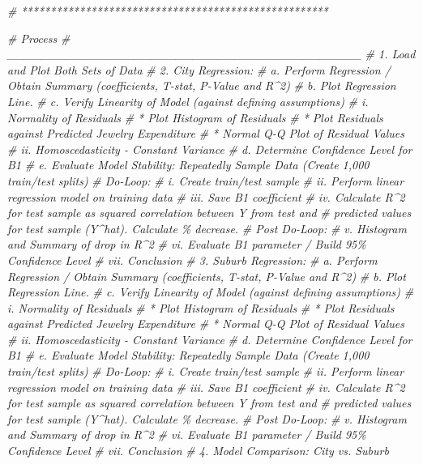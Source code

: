 \documentclass[
]{article}
\newenvironment{Shaded}{\begin{snugshade}}{\end{snugshade}}
\newcommand{\CommentTok}[1]{\textcolor[rgb]{0.56,0.35,0.01}{\textit{#1}}}
\begin{document}
\begin{Shaded}
\begin{Highlighting}[]
\CommentTok{\# *****************************************************}

\CommentTok{\# Process}
\CommentTok{\# \_\_\_\_\_\_\_\_\_\_\_\_\_\_\_\_\_\_\_\_\_\_\_\_\_\_\_\_\_\_\_\_\_\_\_\_\_\_\_\_\_\_}
\CommentTok{\# 1. Load and Plot Both Sets of Data}
\CommentTok{\# 2. City Regression:}
\CommentTok{\#    a. Perform Regression / Obtain Summary (coefficients, T{-}stat, P{-}Value and R\^{}2)}
\CommentTok{\#    b. Plot Regression Line.}
\CommentTok{\#    c. Verify Linearity of Model (against defining assumptions)}
\CommentTok{\#       i. Normality of Residuals}
\CommentTok{\#           * Plot Histogram of Residuals}
\CommentTok{\#           * Plot Residuals against Predicted Jewelry Expenditure}
\CommentTok{\#           * Normal Q{-}Q Plot of Residual Values}
\CommentTok{\#       ii. Homoscedasticity {-} Constant Variance}
\CommentTok{\#    d. Determine Confidence Level for B1}
\CommentTok{\#    e. Evaluate Model Stability: Repeatedly Sample Data (Create 1,000 train/test splits)}
\CommentTok{\#       Do{-}Loop:}
\CommentTok{\#       i.   Create train/test sample}
\CommentTok{\#       ii.  Perform linear regression model on training data}
\CommentTok{\#       iii. Save B1 coefficient}
\CommentTok{\#       iv.  Calculate R\^{}2 for test sample as squared correlation between Y from test and}
\CommentTok{\#            predicted values for test sample (Y\^{}hat). Calculate \% decrease.}
\CommentTok{\#       Post Do{-}Loop:}
\CommentTok{\#       v.   Histogram and Summary of drop in R\^{}2}
\CommentTok{\#       vi.  Evaluate B1 parameter / Build 95\% Confidence Level}
\CommentTok{\#       vii. Conclusion}
\CommentTok{\# 3. Suburb Regression:}
\CommentTok{\#    a. Perform Regression / Obtain Summary (coefficients, T{-}stat, P{-}Value and R\^{}2)}
\CommentTok{\#    b. Plot Regression Line.}
\CommentTok{\#    c. Verify Linearity of Model (against defining assumptions)}
\CommentTok{\#       i. Normality of Residuals}
\CommentTok{\#           * Plot Histogram of Residuals}
\CommentTok{\#           * Plot Residuals against Predicted Jewelry Expenditure}
\CommentTok{\#           * Normal Q{-}Q Plot of Residual Values}
\CommentTok{\#       ii. Homoscedasticity {-} Constant Variance}
\CommentTok{\#    d. Determine Confidence Level for B1}
\CommentTok{\#    e. Evaluate Model Stability: Repeatedly Sample Data (Create 1,000 train/test splits)}
\CommentTok{\#       Do{-}Loop:}
\CommentTok{\#       i.   Create train/test sample}
\CommentTok{\#       ii.  Perform linear regression model on training data}
\CommentTok{\#       iii. Save B1 coefficient}
\CommentTok{\#       iv.  Calculate R\^{}2 for test sample as squared correlation between Y from test and}
\CommentTok{\#            predicted values for test sample (Y\^{}hat). Calculate \% decrease.}
\CommentTok{\#       Post Do{-}Loop:}
\CommentTok{\#       v.   Histogram and Summary of drop in R\^{}2}
\CommentTok{\#       vi.  Evaluate B1 parameter / Build 95\% Confidence Level}
\CommentTok{\#       vii. Conclusion}
\CommentTok{\# 4. Model Comparison: City vs. Suburb}
\end{Highlighting}
\end{Shaded}
\end{document}
